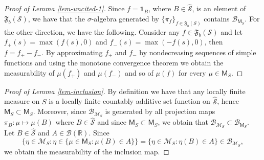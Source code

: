 \documentclass{article}
\theoremstyle{plain}
\theoremstyle{remark}
\begin{document}
\begin{proof}[Proof of Lemma \ref{lem-uncited-1}]
	Since $f=\mathbf{1}_B$, where $B\in\hat{\mathcal{S}}$, is an element of $\mathfrak{F}_{b}(\mathcal{S})$, we have that the $\sigma$-algebra generated by $\{\pi_f\}_{f\in\mathfrak{F}_{b}(\mathcal{S})}$ contains $\mathcal{B}_{\mathsf{M}_S}$. For the other direction, we have the following. Consider any $f\in\mathfrak{F}_{b}(\mathcal{S})$ and let $f_+(s)=\max(f(s),0)$ and $f_-(s)=\max(-f(s), 0)$, then $f=f_+-f_-$. By approximating $f_+$ and $f_-$ by nondecreasing sequences of simple functions and using the monotone convergence theorem we obtain the measurability of $\mu(f_+)$ and $\mu(f_-)$ and so of $\mu(f)$ for every $\mu\in \mathsf{M}_{S}$.
\end{proof}


\begin{proof}[Proof of Lemma \ref{lem-inclusion}]
	By definition we have that any locally finite measure on $S$ is a locally finite countably additive set function on $\hat{\mathcal{S}}$, hence $\mathsf{M}_{S}\subset\mathsf{M}_{S}$. Moreover, since $\mathcal{B}_{\mathcal{M}_S}$ is generated by all projection maps $\pi_{B}:\mu\mapsto\mu(B)$ where $B\in\hat{\mathcal{S}}$ and since $\mathsf{M}_{S}\subset\mathsf{M}_{S}$, we obtain that $\mathcal{B}_{\mathcal{M}_S}\subset \mathcal{B}_{\mathsf{M}_S}$. Let $B\in\hat{\mathcal{S}}$ and $A\in\mathcal{B}(\mathbb{R})$. Since
	\begin{equation*}
		\{\eta\in\mathcal{M}_S:\eta\in \{\mu\in\mathsf{M}_S:\mu(B)\in A\} \}=	\{\eta\in\mathcal{M}_S:\eta(B)\in A\}\in \mathcal{B}_{\mathcal{M}_S},
	\end{equation*}
	we obtain the measurability of the inclusion map. 
	

\end{proof}
\end{document}
